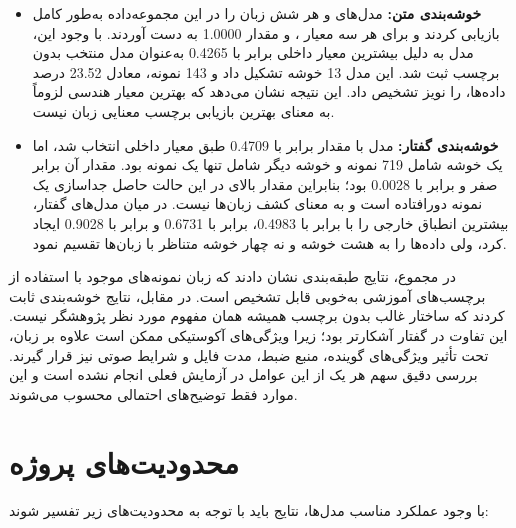 \begin{itemize}
	\item \textbf{خوشه‌بندی متن:}
	مدل‌های
	و
	هر شش زبان را در این مجموعه‌داده به‌طور کامل بازیابی کردند و برای هر سه معیار
	،
	و
	مقدار 1.0000 به دست آوردند. با وجود این، مدل
	به دلیل بیشترین معیار داخلی
	برابر با 0.4265 به‌عنوان مدل منتخب بدون برچسب ثبت شد. این مدل 13 خوشه تشکیل داد و 143 نمونه، معادل 23.52 درصد داده‌ها، را نویز تشخیص داد. این نتیجه نشان می‌دهد که بهترین معیار هندسی لزوماً به معنای بهترین بازیابی برچسب معنایی زبان نیست.

	\item \textbf{خوشه‌بندی گفتار:}
	مدل
	با مقدار
	برابر با 0.4709 طبق معیار داخلی انتخاب شد، اما یک خوشه شامل 719 نمونه و خوشه دیگر شامل تنها یک نمونه بود. مقدار
	آن برابر صفر و
	برابر با 0.0028 بود؛ بنابراین مقدار بالای
	در این حالت حاصل جداسازی یک نمونه دورافتاده است و به معنای کشف زبان‌ها نیست. در میان مدل‌های گفتار،
	بیشترین انطباق خارجی را با
	برابر با 0.4983،
	برابر با 0.6731 و
	برابر با 0.9028 ایجاد کرد، ولی داده‌ها را به هشت خوشه و نه چهار خوشه متناظر با زبان‌ها تقسیم نمود.
\end{itemize}

در مجموع، نتایج طبقه‌بندی نشان دادند که زبان نمونه‌های موجود با استفاده از برچسب‌های آموزشی به‌خوبی قابل تشخیص است. در مقابل، نتایج خوشه‌بندی ثابت کردند که ساختار غالب بدون برچسب همیشه همان مفهوم مورد نظر پژوهشگر نیست. این تفاوت در گفتار آشکارتر بود؛ زیرا ویژگی‌های آکوستیکی ممکن است علاوه بر زبان، تحت تأثیر ویژگی‌های گوینده، منبع ضبط، مدت فایل و شرایط صوتی نیز قرار گیرند. بررسی دقیق سهم هر یک از این عوامل در آزمایش فعلی انجام نشده است و این موارد فقط توضیح‌های احتمالی محسوب می‌شوند.


\section{محدودیت‌های پروژه}

با وجود عملکرد مناسب مدل‌ها، نتایج باید با توجه به محدودیت‌های زیر تفسیر شوند:

